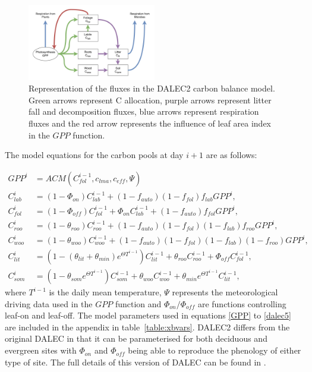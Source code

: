 \documentclass[review]{elsarticle}
\begin{document}
\begin{figure}[ht]
    \centering
    \includegraphics[width=0.5\textwidth]{dalec2diag.pdf}
    \caption{Representation of the fluxes in the DALEC2 carbon balance model. Green arrows represent C allocation, purple arrows represent litter fall and decomposition fluxes, blue arrows represent respiration fluxes and the red arrow represents the influence of leaf area index in the $GPP$ function.} \label{fig:DALEC_mod}
\end{figure}

The model equations for the carbon pools at day $i+1$ are as follows:

\begin{align}
GPP^{i} &= ACM(C_{fol}^{i-1}, c_{lma}, c_{eff}, \Psi) \label{GPP}
\\C_{lab}^{i}&=(1-\Phi _{on})C_{lab}^{i-1}+(1-f_{auto})(1-f_{fol})f_{lab}GPP^{i}, \label{daleclab}
\\C_{fol}^{i}&=(1-\Phi_{off})C_{fol}^{i-1}+\Phi_{on}C_{lab}^{i-1}+(1-f_{auto})f_{fol}GPP^{i}, \label{dalec1}
\\C_{roo}^{i}&=(1-\theta_{roo})C_{roo}^{i-1}+(1-f_{auto})(1-f_{fol})(1-f_{lab})f_{roo}GPP^{i}, 
\\C_{woo}^{i}&=(1-\theta_{woo})C_{woo}^{i-1}+(1-f_{auto})(1-f_{fol})(1-f_{lab})(1-f_{roo})GPP^{i}, 
\\C_{lit}^{i}&=(1-(\theta_{lit}+\theta_{min})e^{\Theta T^{i-1}})C_{lit}^{i-1}+\theta_{roo}C_{roo}^{i-1}+\Phi_{off}C_{fol}^{i-1}, 
\\C_{som}^{i}&=(1-\theta_{som}e^{\Theta T^{i-1}})C_{som}^{i-1}+\theta_{woo}C_{woo}^{i-1}+\theta_{min}e^{\Theta T^{i-1}}C_{lit}^{i-1}, \label{dalec5}
\end{align}
where $T^{i-1}$ is the daily mean temperature, $\Psi$ represents the meteorological driving data used in the $GPP$ function and $\Phi_{on} / \Phi_{off}$ are functions controlling leaf-on and leaf-off. The model parameters used in equations \eqref{GPP} to \eqref{dalec5} are included in the appendix in table~\ref{table:xbvars}. DALEC2 differs from the original DALEC in that it can be parameterised for both deciduous and evergreen sites with $\Phi_{on}$ and $\Phi_{off}$ being able to reproduce the phenology of either type of site. The full details of this version of DALEC can be found in \cite{Bloom2015}. 
\end{document}
